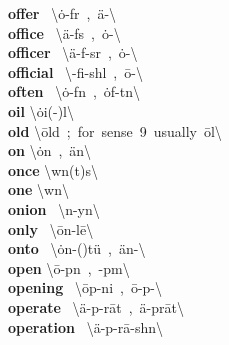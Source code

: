 \documentclass[10pt,a4paper]{article}
\begin{document}
\begin{multicols}{2}
\textbf{ offer }\quad \ \textbackslash \textprimstress \.{o}-f\textschwa r\ ,\ \textprimstress \"{a}-\textbackslash \\
\textbf{ office }\quad \ \textbackslash \textprimstress \"{a}-f\textschwa s\ ,\ \textprimstress \.{o}-\textbackslash \\
\textbf{ officer }\quad \ \textbackslash \textprimstress \"{a}-f\textschwa -s\textschwa r\ ,\ \textprimstress \.{o}-\textbackslash \\
\textbf{ official }\quad \ \textbackslash \textschwa -\textprimstress fi-sh\textschwa l\ ,\ \={o}-\textbackslash \\
\textbf{ often }\quad \ \textbackslash \textprimstress \.{o}-f\textschwa n\ ,\ \textprimstress \.{o}f-t\textschwa n\textbackslash \\
\textbf{ oil }\quad \textbackslash \textprimstress \.{o}i(-\textschwa )l\textbackslash \\
\textbf{ old }\quad \textbackslash \textprimstress \={o}ld\ ;\ for\ sense\ 9\ usually\ \textprimstress \={o}l\textbackslash \\
\textbf{ on }\quad \textbackslash \textprimstress \.{o}n\ ,\ \textprimstress \"{a}n\textbackslash \\
\textbf{ once }\quad \textbackslash \textprimstress w\textschwa n(t)s\textbackslash \\
\textbf{ one }\quad \textbackslash \textprimstress w\textschwa n\textbackslash \\
\textbf{ onion }\quad \ \textbackslash \textprimstress \textschwa n-y\textschwa n\textbackslash \\
\textbf{ only }\quad \ \textbackslash \textprimstress \={o}n-l\={e}\textbackslash \\
\textbf{ onto }\quad \ \textbackslash \textprimstress \.{o}n-(\textsecstress )t\"{u}\ ,\ \textprimstress \"{a}n-\textbackslash \\
\textbf{ open }\quad \textbackslash \textprimstress \={o}-p\textschwa n\ ,\ -p\textsuperscript{\textreve}m\textbackslash \\
\textbf{ opening }\quad \ \textbackslash \textprimstress \={o}p-ni\engma \ ,\ \textprimstress \={o}-p\textschwa -\textbackslash \\
\textbf{ operate }\quad \ \textbackslash \textprimstress \"{a}-p\textschwa -\textsecstress r\={a}t\ ,\ \textprimstress \"{a}-\textsecstress pr\={a}t\textbackslash \\
\textbf{ operation }\quad \ \textbackslash \textsecstress \"{a}-p\textschwa -\textprimstress r\={a}-sh\textschwa n\textbackslash \\

\end{multicols}
\end{document}

